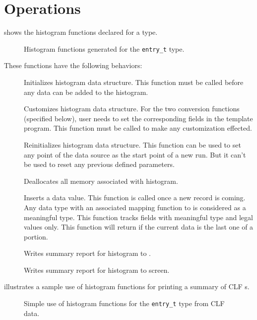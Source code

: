 \section{Operations}
 shows the histogram functions declared 
for a \pads{} type.
\begin{figure}
\caption{Histogram functions generated for the \texttt{entry\_t} type.}
\label{figure:histogram}
\end{figure}
%
These functions have the following behaviors:
\begin{description}
\item[] Initializes histogram data
  structure. This function must be called before any data can be added
  to the histogram.
\item[] Customizes histogram data
  structure. For the two conversion functions (specified below), user
  needs to set the corresponding fields in the template program. This
  function must be called to make any customization effected.  
\item[] Reinitializes histogram data
  structure. This function can be used to set any point of the data
  source as the start point of a new run. But it can't be used to 
  reset any previous defined parameters.
\item[] Deallocates all memory associated
  with histogram.
\item[] Inserts a data value. This function 
  is called once a new record is coming. Any data type with an
  associated mapping function to  is considered as a 
  meaningful type. This function tracks fields with meaningful type
  and legal values only. This function will return  if the
  current data is the last one of a portion.
\item[] Writes summary report for
  histogram  to . 
\item[] Writes summary report for
  histogram  to screen. 
\end{description}
 illustrates a sample use of histogram
functions for printing a summary of CLF s.  
\begin{figure}
\caption{Simple use of histogram functions for the
  \texttt{entry\_t} type from CLF data.}
\label{figure:wsl-hist-hand}
\end{figure}

